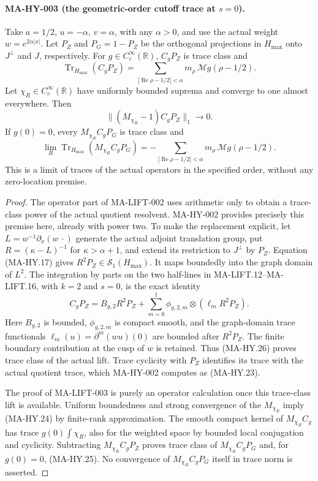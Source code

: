 \paragraph{MA-HY-003 (the geometric-order cutoff trace at $s=0$).}
Take $a=1/2$, $u=-\alpha$, $v=\alpha$, with any $\alpha>0$,
and use the actual weight $w=e^{2\alpha|x|}$.
Let $P_Z$ and $P_G=1-P_Z$ be the orthogonal projections in
$H_{\max}$ onto $J^\perp$ and $J$, respectively.
For $g\in C_c^\infty(\mathbb R)$,
$C_gP_Z$ is trace class and
\[
 \operatorname{Tr}_{H_{\max}}(C_gP_Z)
  =\sum_{|\operatorname{Re}\rho-1/2|<\alpha}
                    m_\rho\,\mathcal Mg(\rho-1/2).
 \tag{MA-HY.23}
\]
Let $\chi_R\in C_c^\infty(\mathbb R)$ have uniformly bounded
suprema and converge to one almost everywhere.
Then
\[
       \|(M_{\chi_R}-1)C_gP_Z\|_1\longrightarrow0.
 \tag{MA-HY.24}
\]
If $g(0)=0$, every $M_{\chi_R}C_gP_G$ is trace class and
\[
 \lim_R\operatorname{Tr}_{H_{\max}}(M_{\chi_R}C_gP_G)
   =-\sum_{|\operatorname{Re}\rho-1/2|<\alpha}
                    m_\rho\,\mathcal Mg(\rho-1/2).
 \tag{MA-HY.25}
\]
This is a limit of traces of the actual operators in the
specified order, without any zero-location premise.

\begin{proof}
The operator part of MA-LIFT-002 uses arithmetic only to
obtain a trace-class power of the actual quotient resolvent.
MA-HY-002 provides precisely this premise here, already
with power two.  To make the replacement explicit, let
$L=w^{-1}\partial_x(w\,\cdot)$ generate the actual adjoint
translation group, put $R=(\kappa-L)^{-1}$ for
$\kappa>\alpha+1$, and extend its restriction to
$J^\perp$ by $P_Z$.  Equation (MA-HY.17) gives
$R^2P_Z\in\mathcal S_1(H_{\max})$.
It maps boundedly into the graph domain of $L^2$.
The integration by parts on the two half-lines in
MA-LIFT.12--MA-LIFT.16, with $k=2$ and $s=0$, is the
exact identity
\[
        C_gP_Z=B_{g,2}R^2P_Z+
              \sum_{m=0}^{1}
                \phi_{g,2,m}\otimes(\ell_mR^2P_Z).
 \tag{MA-HY.26}
\]
Here $B_{g,2}$ is bounded, $\phi_{g,2,m}$ is compact
smooth, and the graph-domain trace functionals
$\ell_m(u)=\partial^m(wu)(0)$ are bounded after
$R^2P_Z$.  The finite boundary contribution at the
cusp of $w$ is retained.  Thus (MA-HY.26) proves trace
class of the actual lift.  Trace cyclicity with $P_Z$
identifies its trace with the actual quotient trace,
which MA-HY-002 computes as (MA-HY.23).

The proof of MA-LIFT-003 is purely an operator calculation
once this trace-class lift is available.
Uniform boundedness and strong convergence of the
$M_{\chi_R}$ imply (MA-HY.24) by finite-rank approximation.
The smooth compact kernel of $M_{\chi_R}C_g$ has trace
$g(0)\int\chi_R$, also for the weighted space by bounded
local conjugation and cyclicity.  Subtracting
$M_{\chi_R}C_gP_Z$ proves trace class of
$M_{\chi_R}C_gP_G$ and, for $g(0)=0$, (MA-HY.25).
No convergence of $M_{\chi_R}C_gP_G$ itself in trace norm
is asserted.
\end{proof}

